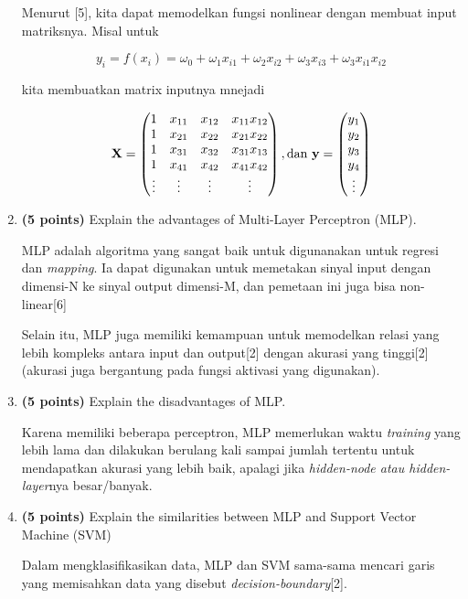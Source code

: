 \documentclass[12pt]{article}%
\begin{document}
\begin{enumerate}
	\par Menurut [5], kita dapat memodelkan fungsi nonlinear dengan membuat input matriksnya. Misal untuk 

		\[y_i = f(x_i) = \omega_0 + \omega_1x_{i1} + \omega_2x_{i2} + \omega_3x_{i3} + \omega_3x_{i1} x_{i2}\]

	\par kita membuatkan matrix inputnya mnejadi

		\[\textup{\textbf{X}} = \begin{pmatrix} 1 & x_{11} & x_{12} & x_{11}x_{12}\\ 1 & x_{21} & x_{22} & x_{21}x_{22}\\ 1 & x_{31} & x_{32} & x_{31}x_{13}\\ 1 & x_{41} & x_{42} & x_{41}x_{42}\\ \vdots & \vdots & \vdots & \vdots \end{pmatrix} , \textup{dan} \ \textup{\textbf{y}} = \begin{pmatrix} y_1\\ y_2\\ y_3\\ y_4\\ \vdots \end{pmatrix}\]

	\item \textbf{(5 points)} Explain the advantages of Multi-Layer Perceptron (MLP).
	\par MLP adalah algoritma yang sangat baik untuk digunanakan untuk regresi dan \textit{mapping}. Ia dapat digunakan untuk memetakan sinyal input dengan dimensi-N ke sinyal output dimensi-M, dan pemetaan ini juga bisa non-linear[6]

	\par Selain itu, MLP juga memiliki kemampuan untuk memodelkan relasi yang lebih kompleks antara input dan output[2] dengan akurasi yang tinggi[2] (akurasi juga bergantung pada fungsi aktivasi yang digunakan).

	\item \textbf{(5 points)} Explain the disadvantages of MLP.
	\par Karena memiliki beberapa perceptron, MLP memerlukan waktu \textit{training} yang lebih lama dan dilakukan berulang kali sampai jumlah tertentu untuk mendapatkan akurasi yang lebih baik, apalagi jika \textit{hidden-node atau hidden-layer}nya besar/banyak.

	\item \textbf{(5 points)} Explain the similarities between MLP and Support Vector Machine (SVM)
	\par Dalam mengklasifikasikan data, MLP dan SVM sama-sama mencari garis yang memisahkan data yang disebut \textit{decision-boundary}[2].


\end{enumerate}
\end{document}
